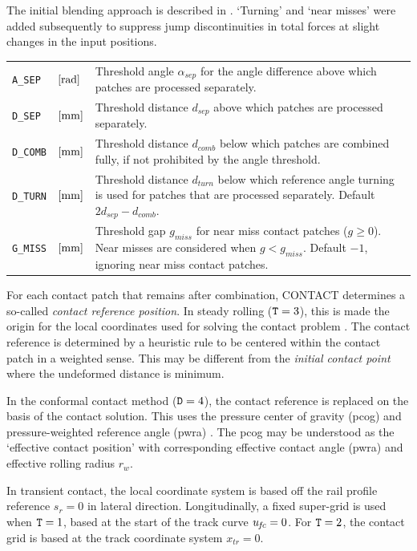 \documentclass[12pt]{report}
\newenvironment{inputvars}{\vspace{0.4\baselineskip}%

\begin{tabular}{>{\raggedright}p{22mm}p{19mm}p{113mm}}}{
\end{tabular}

}
\newcommand{\inpvar}[3]{{\small\tt #1} & $#2$ & #3 \\[1ex]}
\begin{document}
The initial blending approach is described in \cite{Vollebregt2020b-wrgeom,
Vollebregt2020c-distr-force}. `Turning' and `near misses' were added
subsequently to suppress jump discontinuities in total forces at slight
changes in the input positions.
\begin{inputvars}
\inpvar{A\_SEP}{\bunit{rad}}{Threshold angle $\alpha_{sep}$ for the angle
        difference above which patches are processed separately.}
\inpvar{D\_SEP}{\bunit{mm}}{Threshold distance $d_{sep}$ above which patches
        are processed separately.}
\inpvar{D\_COMB}{\bunit{mm}}{Threshold distance $d_{comb}$ below which
        patches are combined fully, if not prohibited by the angle threshold.}
\inpvar{D\_TURN}{\bunit{mm}}{Threshold distance $d_{turn}$ below which
        reference angle turning is used for patches that are processed
        separately. Default $2 d_{sep}-d_{comb}$.}
\inpvar{G\_MISS}{\bunit{mm}}{Threshold gap $g_{miss}$ for near miss
        contact patches ($g\ge 0$). Near misses are considered when
        $g<g_{miss}$. Default $-1$, ignoring near miss contact patches.}
\end{inputvars}
For each contact patch that remains after combination, CONTACT determines a
so-called {\em contact reference position\/}. In steady rolling (${\tt
T}=3$), this is made the origin for the local coordinates used for solving the
contact problem \cite{Vollebregt2020b-wrgeom}. The contact reference is
determined by a heuristic rule to be centered within the contact patch in
a weighted sense. This may be different from the {\em initial contact
point\/} where the undeformed distance is minimum. 

In the conformal contact method (${\tt D}=4$), the contact reference is
replaced on the basis of the contact solution. This uses the pressure
center of gravity (pcog) and pressure-weighted reference angle (pwra)
\cite{Vollebregt2018a-sdec}. The pcog may be understood as the `effective
contact position' with corresponding effective contact angle (pwra) and
effective rolling radius $r_w$.

In transient contact, the local coordinate system is based off the rail
profile reference $s_r=0$ in lateral direction. Longitudinally, a fixed
super-grid is used when ${\tt T}=1$, based at the start of the track curve
$u_{\mkern-2muf\mkern-2muc}=0$. For ${\tt T}=2$, the contact grid is based at the track
coordinate system $x_{tr}=0$.
\end{document}
